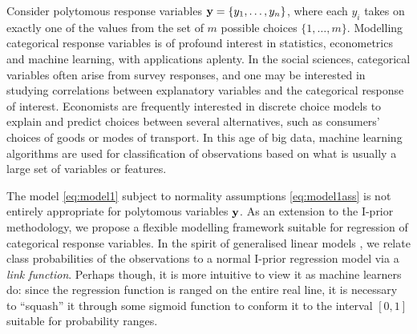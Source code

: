 \documentclass[showframe,11pt,twoside,openright]{report}
\begin{document}
\label{chapter5}
\thispagestyle{chapterfive}

Consider polytomous response variables ${\mathbf y} = \{y_1,\dots,y_n\}$, where each $y_i$ takes on exactly one of the values from the set of $m$ possible choices $\{1,\dots,m\}$.
Modelling categorical response variables is of profound interest in statistics, econometrics and machine learning, with applications aplenty. 
In the social sciences, categorical variables often arise from survey responses, and one may be interested in studying correlations between  explanatory variables and the categorical response of interest.
Economists are frequently interested in discrete choice models to explain and predict choices between several alternatives, such as consumers' choices of goods or modes of transport.
In this age of big data, machine learning algorithms are used for classification of observations based on what is usually a large set of variables or features.

The model \cref{eq:model1} subject to normality assumptions \cref{eq:model1ass} is not entirely appropriate for polytomous variables ${\mathbf y}$.
As an extension to the I-prior methodology, we propose a flexible modelling framework suitable for regression of categorical response variables.
In the spirit of generalised linear models \citep{mccullagh1989}, we relate class probabilities of the observations to a normal I-prior regression model via a \emph{link function}.
Perhaps though, it is more intuitive to view it as machine learners do: since the regression function is ranged on the entire real line, it is necessary to ``squash'' it through some sigmoid function to conform it to the interval $[0,1]$ suitable for probability ranges.
\end{document}
